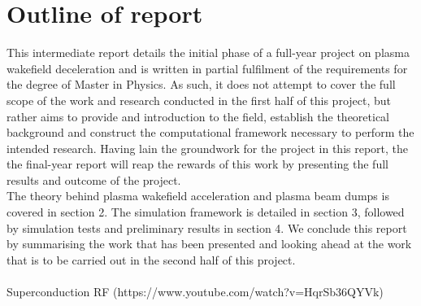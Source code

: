\section{Outline of report}
This intermediate report details the initial phase of a full-year project on plasma wakefield deceleration and is written in partial fulfilment of the requirements for the degree of Master in Physics. As such, it does not attempt to cover the full scope of the work and research conducted in the first half of this project, but rather aims to provide and introduction to the field, establish the theoretical background and construct the computational framework necessary to perform the intended research. Having lain the groundwork for the project in this report, the the final-year report will reap the rewards of this work by presenting the full results and outcome of the project.\\
The theory behind plasma wakefield acceleration and plasma beam dumps is covered in section 2. The simulation framework is detailed in section 3, followed by simulation tests and preliminary results in section 4. We conclude this report by summarising the work that has been presented and looking ahead at the work that is to be carried out in the second half of this project.
\\
\\
Superconduction RF (https://www.youtube.com/watch?v=HqrSb36QYVk)